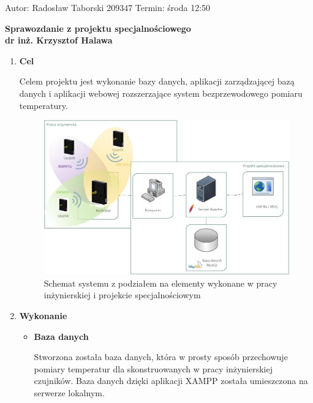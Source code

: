 \documentclass[eng,printmode,openright]{mgr} %
\begin{document}
Autor: Radosław Taborski 209347 \hspace{10em} Termin: środa 12:50

\begin{center}
\huge{\textbf{Sprawozdanie z projektu specjalnościowego}}\\

\large{\textbf{dr inż. Krzysztof Halawa}}
\end{center}

\begin{enumerate}
	\item {\large \textbf{Cel}}
	
	Celem projektu jest wykonanie bazy danych, aplikacji zarządzającej bazą danych i aplikacji webowej rozszerzające system bezprzewodowego pomiaru temperatury.
	 
	\begin{figure}[H]
		\centering
		\includegraphics[width=1\linewidth]{schemat.jpg}
		\caption{Schemat systemu z podziałem na elementy wykonane w pracy inżynierskiej i projekcie specjalnościowym }
		\label{schemat}
	\end{figure}
	
	
	\item {\large \textbf{Wykonanie}}
	\begin{itemize}		
		\item \textbf{{\large Baza danych}}
		
		Stworzona została baza danych, która w prosty sposób przechowuje pomiary temperatur dla skonstruowanych w pracy inżynierskiej czujników. Baza danych dzięki aplikacji XAMPP została umieszczona na serwerze lokalnym. 
		

\end{itemize}
\end{enumerate}
\end{document}
